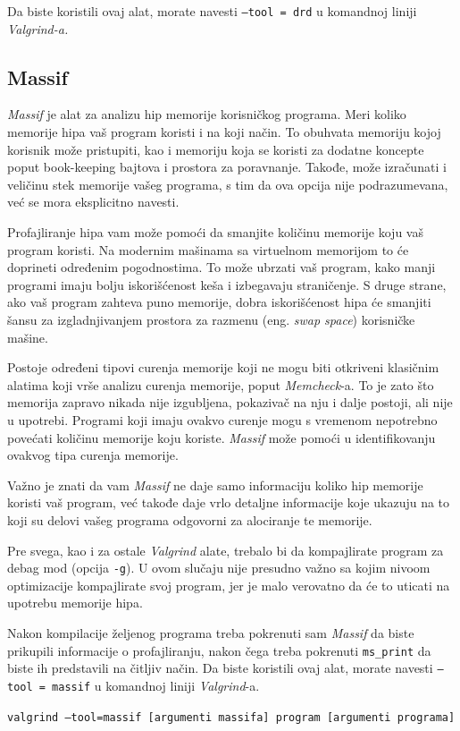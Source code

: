 \documentclass[12pt,oneside]{memoir}
\theoremstyle{plain}
\theoremstyle{definition}
\begin{document}
Da biste koristili ovaj alat, morate navesti \texttt{--tool = drd} u komandnoj liniji \textit{Valgrind-a.}

\subsection{Massif}
\textit{Massif} je alat za analizu hip memorije korisničkog programa. Meri koliko memorije hipa vaš program koristi i na koji način. To obuhvata memoriju kojoj korisnik može pristupiti, kao i memoriju koja se koristi za dodatne koncepte poput book-keeping bajtova i prostora za poravnanje. Takođe, može izračunati i veličinu stek memorije vašeg programa, s tim da ova opcija nije podrazumevana, već se mora eksplicitno navesti.

Profajliranje hipa vam može pomoći da smanjite količinu memorije koju vaš program koristi. Na modernim mašinama sa virtuelnom memorijom to će doprineti određenim pogodnostima. To može ubrzati vaš program, kako manji programi imaju bolju iskorišćenost keša i izbegavaju straničenje. S druge strane, ako vaš program zahteva puno memorije, dobra iskorišćenost hipa će smanjiti šansu za izgladnjivanjem prostora za razmenu (eng. \textit{swap space}) korisničke mašine. 

Postoje određeni tipovi curenja memorije koji ne mogu biti otkriveni klasičnim alatima koji vrše analizu curenja memorije, poput \textit{Memcheck}-a. To je zato što memorija zapravo nikada nije izgubljena, pokazivač na nju i dalje postoji, ali nije u upotrebi. Programi koji imaju ovakvo curenje mogu s vremenom nepotrebno povećati količinu memorije koju koriste. \textit{Massif} može pomoći u identifikovanju ovakvog tipa curenja memorije.

Važno je znati da vam \textit{Massif} ne daje samo informaciju koliko hip memorije koristi vaš program, već takođe daje vrlo detaljne informacije koje ukazuju na to koji su delovi vašeg programa odgovorni za alociranje te memorije.

Pre svega, kao i za ostale \textit{Valgrind} alate, trebalo bi da kompajlirate program za debag mod (opcija \texttt{-g}). U ovom slučaju nije presudno važno sa kojim nivoom optimizacije kompajlirate svoj program, jer je malo verovatno da će to uticati na upotrebu memorije hipa.

Nakon kompilacije željenog programa treba pokrenuti sam \textit{Massif} da biste prikupili informacije o profajliranju, nakon čega treba pokrenuti \texttt{ms\_print} da biste ih predstavili na čitljiv način. Da biste koristili ovaj alat, morate navesti \texttt{--tool = massif} u komandnoj liniji \textit{Valgrind}-a.
\begin{center}
\texttt{valgrind --tool=massif [argumenti massifa] program [argumenti programa]}
\end{center}
 
\end{document}
